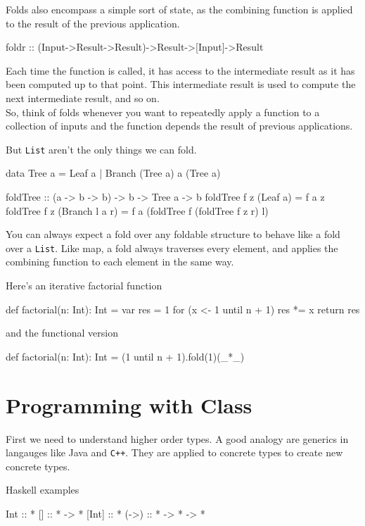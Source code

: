 \documentclass[12pt]{article}
\begin{document}
Folds also encompass a simple sort of state, as the combining function is applied to
the result of the previous application.
\begin{haskell}
foldr :: (Input->Result->Result)->Result->[Input]->Result
\end{haskell}
Each time the function is called, it has access to the intermediate result as it
has been computed up to that point. This intermediate result is used to compute
the next intermediate result, and so on. \\

So, think of folds whenever you want to repeatedly apply a function to a
collection of inputs and the function depends the result of previous
applications.

\newpage

But \texttt{List} aren't the only things we can fold.
\begin{haskell}
data Tree a = Leaf a | Branch (Tree a) a (Tree a)

foldTree :: (a -> b -> b) -> b -> Tree a -> b
foldTree f z (Leaf a)       = f a z
foldTree f z (Branch l a r) = f a (foldTree f (foldTree f z r) l)
\end{haskell}

You can always expect a fold over any foldable structure to behave like a fold
over a \texttt{List}. Like map, a fold always traverses every element, and applies the
combining function to each element in the same way.

Here's an iterative factorial function
\begin{scala}
def factorial(n: Int): Int = {
    var res = 1
    for (x <- 1 until n + 1) {
        res *= x
    }
    return res
}
\end{scala}

and the functional version
\begin{scala}
def factorial(n: Int): Int = {
    (1 until n + 1).fold(1)(_*_)
}
\end{scala}
\newpage

\section*{Programming with Class}

First we need to understand higher order types. A good analogy are generics in
langauges like Java and \texttt{C++}. They are applied to concrete types to
create new concrete types.

Haskell examples
\begin{haskell}
Int   :: *
[]    :: * -> *
[Int] :: *
(->)  :: * -> * -> *
\end{haskell}
\end{document}
